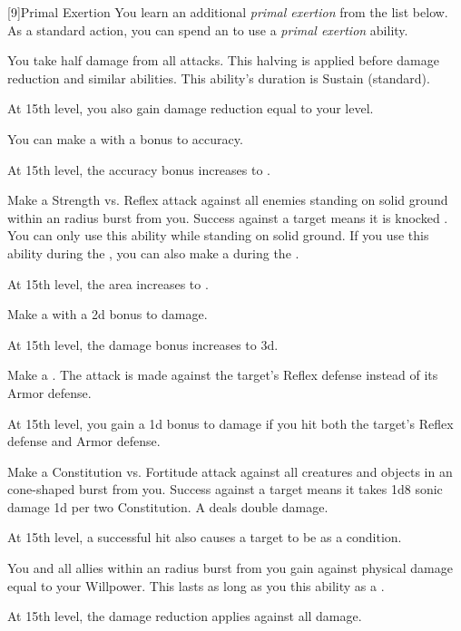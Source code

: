             [9]{Primal Exertion}
            You learn an additional \textit{primal exertion} from the list below.
            As a standard action, you can spend an  to use a \textit{primal exertion} ability.
            {
                 You take half damage from all attacks.
                This halving is applied before damage reduction and similar abilities.
                This ability's duration is Sustain (standard).

                At 15th level, you also gain damage reduction equal to your level.

                 You can make a  with a  bonus to accuracy.

                At 15th level, the accuracy bonus increases to .

                 Make a Strength vs. Reflex attack against all enemies standing on solid ground within an \areamed radius burst from you.
                Success against a target means it is knocked \prone.
                You can only use this ability while standing on solid ground.
                If you use this ability during the , you can also make a  during the .

                At 15th level, the area increases to \arealarge.

                 Make a  with a \plus2d bonus to damage.

                At 15th level, the damage bonus increases to \plus3d.

                 Make a .
                The attack is made against the target's Reflex defense instead of its Armor defense.

                At 15th level, you gain a \plus1d bonus to damage if you hit both the target's Reflex defense and Armor defense.

                 Make a Constitution vs. Fortitude attack against all creatures and objects in an \arealarge cone-shaped burst from you.
                Success against a target means it takes 1d8 sonic damage \plus1d per two Constitution.
                A  deals double damage.

                At 15th level, a successful hit also causes a target to be \deafened as a condition.

                 You and all allies within an \arealarge radius burst from you gain  against physical damage equal to your Willpower.
                This lasts as long as you  this ability as a .

                At 15th level, the damage reduction applies against all damage.
            }

